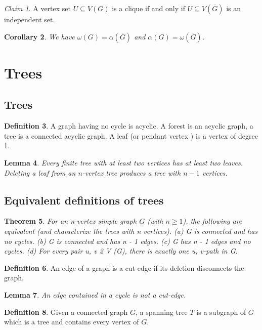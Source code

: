 \documentclass[10pt, fleqn, a4paper, landscape]{article}
\theoremstyle{plain} %
\newtheorem{thm}{Theorem}
\newtheorem{lem}[thm]{Lemma}
\newtheorem{cor}[thm]{Corollary}
\theoremstyle{remark} %
\newtheorem{claim}[thm]{Claim}
\theoremstyle{definition} %
\newtheorem{defi}[thm]{Definition}
\begin{document}
\begin{multicols}{3}
\begin{tiny}
\begin{claim}
A vertex set $U\subseteq V (G)$ is a clique if and only if $U\subseteq V(\overline{G})$ is an independent set.
\end{claim}

\begin{cor}
We have $\omega(G)=\alpha(\overline{G})$ and $\alpha(G)=\omega(\overline{G})$.
\end{cor}

\section{Trees}
\subsection{Trees}
\begin{defi}
A graph having no cycle is acyclic. A forest is an acyclic graph, a tree is a connected acyclic graph. A leaf (or pendant vertex ) is a vertex of degree 1.
\end{defi}
\addtocounter{thm}{1}
\begin{lem}
Every finite tree with at least two vertices has at least two leaves. Deleting a leaf from an $n$-vertex tree produces a tree with $n-1$ vertices.
\end{lem}

\subsection{Equivalent definitions of trees}

\begin{thm}
For an n-vertex simple graph $G$ (with $n \ge 1$), the following are equivalent (and
characterize the trees with n vertices).
(a) G is connected and has no cycles.
(b) G is connected and has n - 1 edges.
(c) G has n - 1 edges and no cycles.
(d) For every pair u, v 2 V (G), there is exactly one u, v-path in G.
\end{thm}

\begin{defi}
An edge of a graph is a cut-edge if its deletion disconnects the graph.
\end{defi}

\begin{lem}
An edge contained in a cycle is not a cut-edge.
\end{lem}


\begin{defi}
Given a connected graph $G$, a spanning tree $T$ is a subgraph of $G$ which is a tree and contains every vertex of $G$.
\end{defi}


\end{tiny}
\end{multicols}
\end{document}
